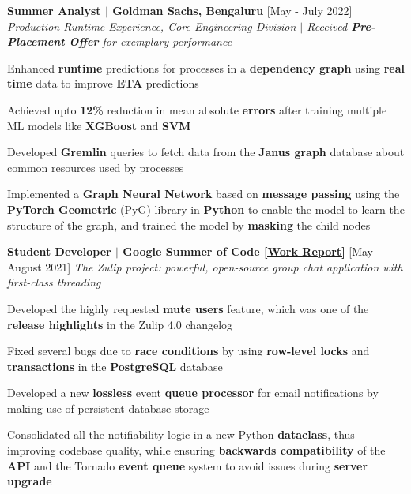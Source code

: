 \documentclass[10pt]{article}
\newcommand{\smallbullet}{
    \small$\bullet$
}
\newcommand{\bigblock}[3]{
    {
        \vspace*{3pt}
        \hspace*{-7pt} {\large{\textbf{#1}}} \hfill #2 \newline
        \textit{\textsf{#3}}
    }
}
\newenvironment{bullet-list-minor}{
    \begin{list}{
        \smallbullet
    }{
        \setlength\leftmargin{15pt}\topsep -6pt \itemsep -5pt
    }
} {
    \end{list}
}
\begin{document}
    \bigblock{
        Summer Analyst \(|\) Goldman Sachs, Bengaluru
    }{
        [May - July 2022]
    }{
        Production Runtime Experience, Core Engineering Division \(|\) Received \textbf{Pre-Placement Offer} for exemplary performance
    }
    \begin{bullet-list-minor}
        \item Enhanced \textbf{runtime} predictions for processes in a \textbf{dependency graph} using \textbf{real time} data to improve \textbf{ETA} predictions
        \item Achieved upto \textbf{12\%} reduction in mean absolute \textbf{errors} after
        training multiple ML models like \textbf{XGBoost} and \textbf{SVM}
        \item Developed \textbf{Gremlin} queries to fetch data from the \textbf{Janus graph} database about common resources used by processes
        \item Implemented a \textbf{Graph Neural Network} based on \textbf{message passing} using the \textbf{PyTorch Geometric} (PyG) library in \textbf{Python} to enable the model to learn the structure of the graph, and trained the model by \textbf{masking} the child nodes
    \end{bullet-list-minor}


    \bigblock{
        Student Developer \(|\) Google Summer of Code {\color{blue} \href{https://gist.github.com/abhijeetbodas2001/bf3af6b8061c792559b97145246ed2e4}{[Work Report]}}
    }{
        [May - August 2021]
    }{
        The Zulip project: powerful, open-source group chat application with first-class threading
    }
    \begin{bullet-list-minor}
        \item Developed the highly requested \textbf{mute users} feature, which was one of the \textbf{release highlights} in the Zulip 4.0 changelog
        \item Fixed several bugs due to \textbf{race conditions} by using \textbf{row-level locks} and \textbf{transactions} in the \textbf{PostgreSQL} database
        \item Developed a new \textbf{lossless} event \textbf{queue processor} for email notifications by making use of persistent database storage
        \item Consolidated all the notifiability logic in a new Python \textbf{dataclass}, thus improving codebase quality, while ensuring \textbf{backwards compatibility} of the \textbf{API} and the Tornado \textbf{event queue} system to avoid issues during \textbf{server upgrade}
    \end{bullet-list-minor}
\end{document}
